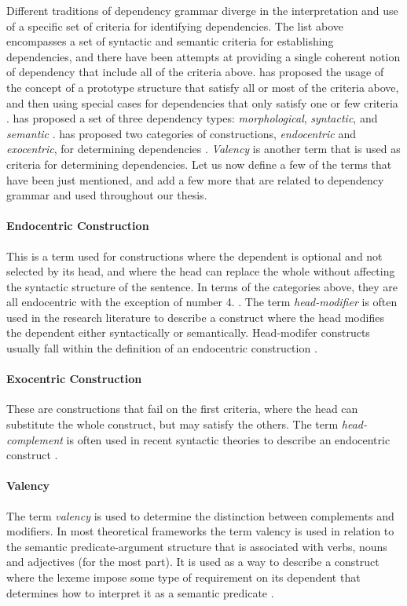 Different traditions of dependency grammar diverge in the interpretation and use of a specific set of criteria for identifying dependencies. The list above encompasses a set of syntactic and semantic criteria for establishing dependencies, and there have been attempts at providing a single coherent notion of dependency that include all of the criteria above. \citeauthor{Hudson:90} has proposed the usage of the concept of a prototype structure that satisfy all or most of the criteria above, and then using special cases for dependencies that only satisfy one or few criteria \cite{Hudson:90}. \citeauthor{Mel:88} has proposed a set of three dependency types: \textit{morphological}, \textit{syntactic}, and \textit{semantic} \cite{Mel:88}. \citeauthor{Nikula:86} has proposed two categories of constructions, \textit{endocentric} and \textit{exocentric}, for determining dependencies \cite{Nikula:86}. \textit{Valency} is another term that is used as criteria for determining dependencies. Let us now define a few of the terms that have been just mentioned, and add a few more that are related to dependency grammar and used throughout our thesis.

\paragraph{Endocentric Construction} This is a term used for constructions where the dependent is optional and not selected by its head, and where the head can replace the whole without affecting the syntactic structure of the sentence. In terms of the categories above, they are all endocentric with the exception of number 4. \cite{KublerEtAl:09}. The term \textit{head-modifier} is often used in the research literature to describe a construct where the head modifies the dependent either syntactically or semantically. Head-modifer constructs usually fall within the definition of an endocentric construction \cite{Niv:05}.

\paragraph{Exocentric Construction} These are constructions that fail on the first criteria, where the head can substitute the whole construct, but may satisfy the others. The term \textit{head-complement} is often used in recent syntactic theories to describe an endocentric construct \cite{Niv:05}.

\paragraph{Valency} The term \textit{valency} is used to determine the distinction between complements and modifiers. In most theoretical frameworks the term valency is used in relation to the semantic predicate-argument structure that is associated with verbs, nouns and adjectives (for the most part). It is used as a way to describe a construct where the lexeme impose some type of requirement on its dependent that determines how to interpret it as a semantic predicate \cite{Niv:05}.

